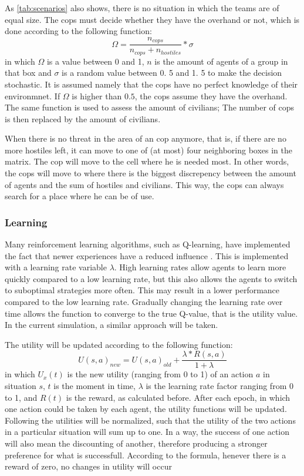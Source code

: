 As \autoref{tab:scenarios} also shows, there is no situation in which the teams are of equal size.
The cops must decide whether they have the overhand or not, which is done according to the following function:
$$ \Omega = \frac{n_{cops}}{n_{cops} + n_{hostiles}}*\sigma $$
in which $\Omega$ is a value between 0 and 1, $n$ is the amount of agents of a group in that box and $\sigma$ is a random value between 0.
5 and 1.
5 to make the decision stochastic.
It is assumed namely that the cops have no perfect knowledge of their environmnet.
If $\Omega$ is higher than $0.
5$, the cops assume they have the overhand.
The same function is used to assess the amount of civilians; The number of cops is then replaced by the amount of civilians.


When there is no threat in the area of an cop anymore, that is, if there are no more hostiles left, it can move to one of (at most) four neighboring boxes in the matrix.
The cop will move to the cell where he is needed most.
In other words, the cops will move to where there is the biggest discrepency between the amount of agents and the sum of hostiles and civilians.
This way, the cops can always search for a place where he can be of use.


\subsubsection{Learning}
Many reinforcement learning algorithms, such as Q-learning, have implemented the fact that newer experiences have a reduced influence  \citep*{watkins1992q}.
This is implemented with a learning rate variable $\lambda$.
High learning rates allow agents to learn more quickly compared to a low learning rate, but this also allows the agents to switch to suboptimal strategies more often.
This may result in a lower performance compared to the low learning rate.
Gradually changing the learning rate over time allows the function to converge to the true Q-value, that is the utility value.
In the current simulation, a similar approach will be taken.


The utility will be updated according to the following function:
$$ U(s,a)_{new} = U(s,a)_{old} + \frac{\lambda * R(s,a)}{1+\lambda} $$
in which $U_x(t)$ is the new utility (ranging from 0 to 1) of an action $a$ in situation $s$, $t$ is the moment in time, $\lambda$ is the learning rate factor ranging from 0 to 1, and $R(t)$ is the reward, as calculated before.
After each epoch, in which one action could be taken by each agent, the utility functions will be updated.
Following the utilities will be normalized, such that the utility of the two actions in a particular situation will sum up to one.
In a way, the success of one action will also mean the discounting of another, therefore producing a stronger preference for what is successfull.
According to the formula, henever there is a reward of zero, no changes in utility will occur

